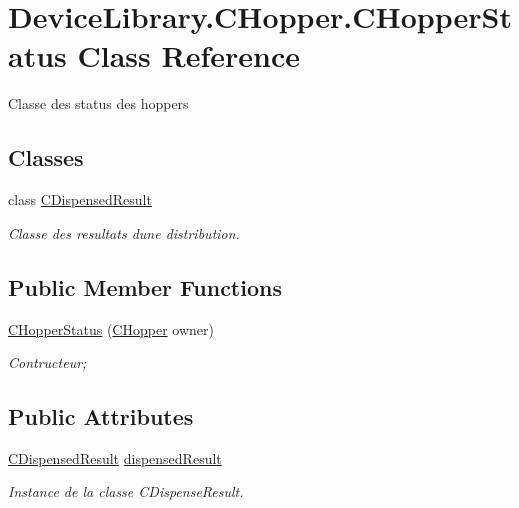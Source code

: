 \hypertarget{class_device_library_1_1_c_hopper_1_1_c_hopper_status}{}\section{Device\+Library.\+C\+Hopper.\+C\+Hopper\+Status Class Reference}
\label{class_device_library_1_1_c_hopper_1_1_c_hopper_status}


Classe des status des hoppers  


\subsection*{Classes}
\begin{DoxyCompactItemize}
\item 
class \mbox{\hyperlink{class_device_library_1_1_c_hopper_1_1_c_hopper_status_1_1_c_dispensed_result}{C\+Dispensed\+Result}}
\begin{DoxyCompactList}\small\item\em Classe des resultats d\textquotesingle{}une distribution. \end{DoxyCompactList}\end{DoxyCompactItemize}
\subsection*{Public Member Functions}
\begin{DoxyCompactItemize}
\item 
\mbox{\hyperlink{class_device_library_1_1_c_hopper_1_1_c_hopper_status_a4c22d7f49dade95cb88e239e94db7200}{C\+Hopper\+Status}} (\mbox{\hyperlink{class_device_library_1_1_c_hopper}{C\+Hopper}} owner)
\begin{DoxyCompactList}\small\item\em Contructeur; \end{DoxyCompactList}\end{DoxyCompactItemize}
\subsection*{Public Attributes}
\begin{DoxyCompactItemize}
\item 
\mbox{\hyperlink{class_device_library_1_1_c_hopper_1_1_c_hopper_status_1_1_c_dispensed_result}{C\+Dispensed\+Result}} \mbox{\hyperlink{class_device_library_1_1_c_hopper_1_1_c_hopper_status_adccf8888101528fac1719c6ca6bb65a3}{dispensed\+Result}}
\begin{DoxyCompactList}\small\item\em Instance de la classe C\+Dispense\+Result. \end{DoxyCompactList}\end{DoxyCompactItemize}
